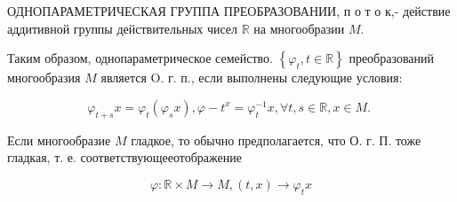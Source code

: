 \documentclass[10pt]{article}
\begin{document}
ОДНОПАРАМЕТРИЧЕСКАЯ ГРУППА ПРЕОБРАЗОВАНИИ, п о т о к,- действие аддитивной группы действительных чисел $\mathbb{R}$ на многообразии $M$.



Таким образом, однопараметрическое семейство. $\left\{\varphi_{t}, t \in \mathbb{R}\right\}$ преобразований многообразия $M$ является O. г. п., если выполнены следующие условия:



\[

\varphi_{t+s} x=\varphi_{t}\left(\varphi_{s} x\right), \varphi-t^{x}=\varphi_{t}^{-1} x, \forall t, s \in \mathbb{R}, x \in M \text {. }

\]



Если многообразие $M$ гладкое, то обычно предполагается, что О. г. П. тоже гладкая, т. е. соответствующееотображение



\[

\varphi: \mathbb{R} \times M \longrightarrow M,(t, x) \longrightarrow \varphi_{t} x

\]
\end{document}
